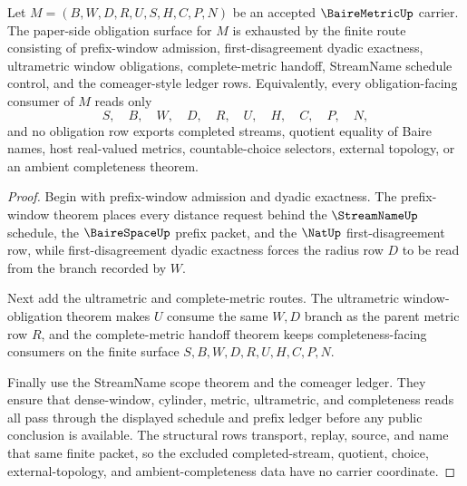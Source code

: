 \begin{theorem}
\label{thm:bairemetric-obligation-closure-route}
Let $M=(B,W,D,R,U,S,H,C,P,N)$ be an accepted $\BaireMetricUp$ carrier. The paper-side obligation surface for $M$ is exhausted by the finite route consisting of prefix-window admission, first-disagreement dyadic exactness, ultrametric window obligations, complete-metric handoff, StreamName schedule control, and the comeager-style ledger rows. Equivalently, every obligation-facing consumer of $M$ reads only
$$
S,\quad B,\quad W,\quad D,\quad R,\quad U,\quad H,\quad C,\quad P,\quad N ,
$$
and no obligation row exports completed streams, quotient equality of Baire names, host real-valued metrics, countable-choice selectors, external topology, or an ambient completeness theorem.
\end{theorem}
\begin{proof}
Begin with prefix-window admission and dyadic exactness. The prefix-window theorem places every distance request behind the $\StreamNameUp$ schedule, the $\BaireSpaceUp$ prefix packet, and the $\NatUp$ first-disagreement row, while first-disagreement dyadic exactness forces the radius row $D$ to be read from the branch recorded by $W$.

Next add the ultrametric and complete-metric routes. The ultrametric window-obligation theorem makes $U$ consume the same $W,D$ branch as the parent metric row $R$, and the complete-metric handoff theorem keeps completeness-facing consumers on the finite surface $S,B,W,D,R,U,H,C,P,N$.

Finally use the StreamName scope theorem and the comeager ledger. They ensure that dense-window, cylinder, metric, ultrametric, and completeness reads all pass through the displayed schedule and prefix ledger before any public conclusion is available. The structural rows transport, replay, source, and name that same finite packet, so the excluded completed-stream, quotient, choice, external-topology, and ambient-completeness data have no carrier coordinate.
\end{proof}


